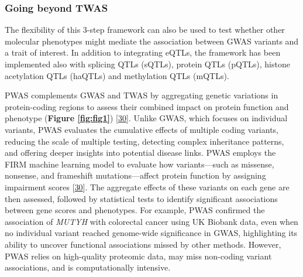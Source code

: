 \hypertarget{going-beyond-twas}{%
\subsubsection{Going beyond TWAS}\label{going-beyond-twas}}

The flexibility of this 3-step framework can also be used to test whether other molecular phenotypes might mediate the association between GWAS variants and a trait of interest.
In addition to integrating eQTLs, the framework has been implemented also with splicing QTLs (sQTLs), protein QTLs (pQTLs), histone acetylation QTLs (haQTLs) and methylation QTLs (mQTLs).

PWAS complements GWAS and TWAS by aggregating genetic variations in protein-coding regions to assess their combined impact on protein function and phenotype (\textbf{Figure \ref{fig:fig1}}) {[}\protect\hyperlink{ref-1Dsj6bEd3}{30}{]}.
Unlike GWAS, which focuses on individual variants, PWAS evaluates the cumulative effects of multiple coding variants, reducing the scale of multiple testing, detecting complex inheritance patterns, and offering deeper insights into potential disease links.
PWAS employs the FIRM machine learning model to evaluate how variants---such as missense, nonsense, and frameshift mutations---affect protein function by assigning impairment scores {[}\protect\hyperlink{ref-1Dsj6bEd3}{30}{]}.
The aggregate effects of these variants on each gene are then assessed, followed by statistical tests to identify significant associations between gene scores and phenotypes.
For example, PWAS confirmed the association of \emph{MUTYH} with colorectal cancer using UK Biobank data, even when no individual variant reached genome-wide significance in GWAS, highlighting its ability to uncover functional associations missed by other methods.
However, PWAS relies on high-quality proteomic data, may miss non-coding variant associations, and is computationally intensive.

